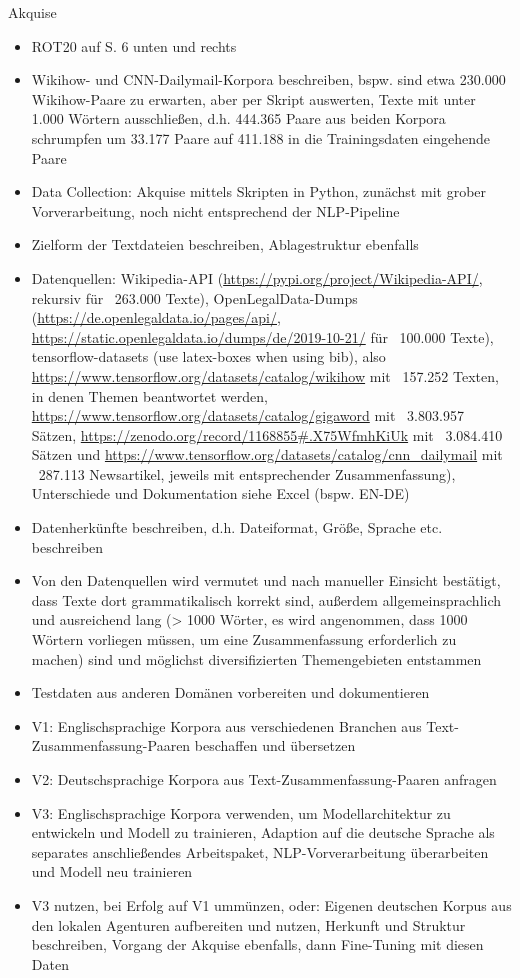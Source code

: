 Akquise
\begin{itemize}
	\item ROT20 auf S. 6 unten und rechts
	\item Wikihow- und CNN-Dailymail-Korpora beschreiben, bspw. sind etwa 230.000 Wikihow-Paare zu erwarten, aber per Skript auswerten, Texte mit unter 1.000 Wörtern ausschließen, d.h. 444.365 Paare aus beiden Korpora schrumpfen um 33.177 Paare auf 411.188 in die Trainingsdaten eingehende Paare
	\item Data Collection: Akquise mittels Skripten in Python, zunächst mit grober Vorverarbeitung, noch nicht entsprechend der NLP-Pipeline
	\item Zielform der Textdateien beschreiben, Ablagestruktur ebenfalls
	\item Datenquellen: Wikipedia-API (\url{https://pypi.org/project/Wikipedia-API/}, rekursiv für ~263.000 Texte), OpenLegalData-Dumps (\url{https://de.openlegaldata.io/pages/api/}, \url{https://static.openlegaldata.io/dumps/de/2019-10-21/} für ~100.000 Texte), tensorflow-datasets (use latex-boxes when using bib), also \url{https://www.tensorflow.org/datasets/catalog/wikihow} mit ~157.252 Texten, in denen Themen beantwortet werden, \url{https://www.tensorflow.org/datasets/catalog/gigaword} mit ~3.803.957 Sätzen, \url{https://zenodo.org/record/1168855#.X75WfmhKiUk} mit ~3.084.410 Sätzen und \url{https://www.tensorflow.org/datasets/catalog/cnn_dailymail} mit ~287.113 Newsartikel, jeweils mit entsprechender Zusammenfassung), Unterschiede und Dokumentation siehe Excel (bspw. EN-DE)
	\item Datenherkünfte beschreiben, d.h. Dateiformat, Größe, Sprache etc. beschreiben
	\item Von den Datenquellen wird vermutet und nach manueller Einsicht bestätigt, dass Texte dort grammatikalisch korrekt sind, außerdem allgemeinsprachlich und ausreichend lang (> 1000 Wörter, es wird angenommen, dass 1000 Wörtern vorliegen müssen, um eine Zusammenfassung erforderlich zu machen) sind und möglichst diversifizierten Themengebieten entstammen
	\item Testdaten aus anderen Domänen vorbereiten und dokumentieren
	\item V1: Englischsprachige Korpora aus verschiedenen Branchen aus Text-Zusammenfassung-Paaren beschaffen und übersetzen
	\item V2: Deutschsprachige Korpora aus Text-Zusammenfassung-Paaren anfragen
	\item V3: Englischsprachige Korpora verwenden, um Modellarchitektur zu entwickeln und Modell zu trainieren, Adaption auf die deutsche Sprache als separates anschließendes Arbeitspaket, NLP-Vorverarbeitung überarbeiten und Modell neu trainieren
	\item V3 nutzen, bei Erfolg auf V1 ummünzen, oder: Eigenen deutschen Korpus aus den lokalen Agenturen aufbereiten und nutzen, Herkunft und Struktur beschreiben, Vorgang der Akquise ebenfalls, dann Fine-Tuning mit diesen Daten
\end{itemize}

